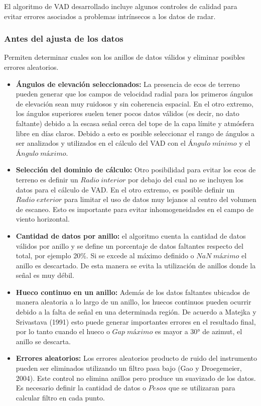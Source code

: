 \documentclass[12pt,spanish,oneside]{book}
\providecommand{\tightlist}{%
  \setlength{\itemsep}{0pt}\setlength{\parskip}{0pt}}
\begin{document}
El algoritmo de VAD desarrollado incluye algunos controles de calidad
para evitar errores asociados a problemas intrínsecos a los datos de
radar.

\subsubsection{Antes del ajusta de los
datos}\label{antes-del-ajusta-de-los-datos}

Permiten determinar cuales son los anillos de datos válidos y eliminar
posibles errores aleatorios.

\begin{itemize}
\tightlist
\item
  \textbf{Ángulos de elevación seleccionados:} La presencia de ecos de
  terreno pueden generar que los campos de velocidad radial para los
  primeros ángulos de elevación sean muy ruidosos y sin coherencia
  espacial. En el otro extremo, los ángulos superiores suelen tener
  pocos datos válidos (es decir, no dato faltante) debido a la escasa
  señal cerca del tope de la capa límite y atmósfera libre en días
  claros. Debido a esto es posible seleccionar el rango de ángulos a ser
  analizados y utilizados en el cálculo del VAD con el
  \(Ángulo \; mínimo\) y el \(Ángulo \; máximo\).
\item
  \textbf{Selección del dominio de cálculo:} Otro posibilidad para
  evitar los ecos de terreno es definir un \(Radio \; interior\) por
  debajo del cual no se incluyen los datos para el cálculo de VAD. En el
  otro extremo, es posible definir un \(Radio \; exterior\) para limitar
  el uso de datos muy lejanos al centro del volumen de escaneo. Esto es
  importante para evitar inhomogeneidades en el campo de viento
  horizontal.
\item
  \textbf{Cantidad de datos por anillo:} el algoritmo cuenta la cantidad
  de datos válidos por anillo y se define un porcentaje de datos
  faltantes respecto del total, por ejemplo 20\%. Si se excede al máximo
  definido o \(NaN \; máximo\) el anillo es descartado. De esta manera
  se evita la utilización de anillos donde la señal es muy débil.
\item
  \textbf{Hueco continuo en un anillo:} Además de los datos faltantes
  ubicados de manera aleatoria a lo largo de un anillo, los huecos
  continuos pueden ocurrir debido a la falta de señal en una determinada
  región. De acuerdo a Matejka y Srivastava (1991) esto puede generar
  importantes errores en el resultado final, por lo tanto cuando el
  hueco o \(Gap \; máximo\) es mayor a 30° de azimut, el anillo se
  descarta.
\item
  \textbf{Errores aleatorios:} Los errores aleatorios producto de ruido
  del instrumento pueden ser eliminados utilizando un filtro pasa bajo
  (Gao y Droegemeier, 2004). Este control no elimina anillos pero
  produce un suavizado de los datos. Es necesario definir la cantidad de
  datos o \(Pesos\) que se utilizaran para calcular filtro en cada
  punto.
\end{itemize}
\end{document}

